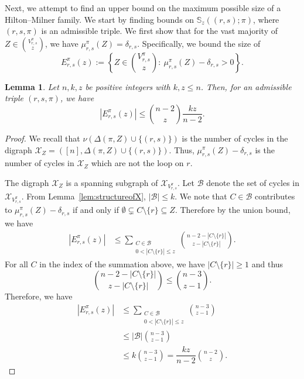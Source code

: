 \documentclass{amsart}
\newtheorem{lem}[thm]{Lemma}
\newcommand{\cy}{\nu}
\newcommand{\bb}{\mathbb}
\newcommand{\mcal}{\mathcal}
\begin{document}
Next, we attempt to find an upper bound on the maximum possible size of a Hilton--Milner family. We start by finding bounds on $\bb{S}_{z}((r,s);\pi)$, where $(r,s,\pi)$ is an admissible triple. We first show that for the vast majority of $Z \in \binom{V_{r,s}^{\pi}}{z}$, we have $\mu_{r,s}^{\pi}(Z)=\delta_{r,s}$. Specifically, we bound the size of
\begin{equation}\label{eq:exceptional}
E_{r,s}^{\pi}(z):=\left\{Z\in \binom{V_{r,s}^{\pi}}{z}\colon\ \mu_{r,s}^{\pi}(Z)-\delta_{r,s}>0\right\}.
\end{equation}

\begin{lem}\label{lem:overestimate}
Let $n,k,z$ be positive integers with $k,z\leq n$. Then, for an admissible triple $(r,s,\pi)$, we have
\[\left|E_{r,s}^{\pi}(z)\right|\leq \binom{n-2}{z} \dfrac{kz}{n-2}.\]
\end{lem}
\begin{proof}
We recall that $\cy(\Delta(\pi,Z) \cup \{(r,s)\})$ is the number of cycles in the digraph $\mcal{X}_{Z}=([n],\Delta(\pi,Z) \cup \{(r,s)\})$. Thus, $\mu_{r,s}^{\pi}(Z)-\delta_{r,s}$ is the number of cycles in $\mcal{X}_{Z}$ which are not the loop on $r$. 

The digraph $\mcal{X}_{Z}$ is a spanning subgraph of $\mcal{X}_{V_{r,s}^{\pi}}$. Let $\mcal{B}$ denote the set of cycles in $\mcal{X}_{V_{r,s}^{\pi}}$.
From Lemma~\ref{lem:structureofX}, $|\mcal{B}| \leq k$. We note that $C \in \mcal{B}$ contributes to $\mu_{r,s}^{\pi}(Z)-\delta_{r,s}$ if and only if $\emptyset \subsetneq C\setminus \{r\} \subseteq Z$. Therefore by the union bound, we have   
\begin{align*}
\left|E_{r,s}^{\pi}(z)\right| &\leq \sum\limits_{\substack{C \in \mcal{B}\\ 0<|C\setminus \{r\}| \leq z}} \binom{n-2-|C\setminus \{r\}|}{z-|C\setminus \{r\}|}.
\end{align*}
For all $C$ in the index of the summation above, we have $|C\setminus \{r\}|\geq 1$ and thus \[\binom{n-2-|C\setminus \{r\}|}{z-|C\setminus \{r\}|} \leq \binom{n-3}{z-1}.\] Therefore, we have
\begin{align*}
\left|E_{r,s}^{\pi}(z)\right| &\leq \sum\limits_{\substack{C \in \mcal{B}\\  0<|C\setminus \{r\}| \leq z}} \binom{n-3}{z-1} \\
& \leq |\mcal{B}|\binom{n-3}{z-1}\\ 
&\leq k \binom{n-3}{z-1} = \dfrac{kz}{n-2} \binom{n-2}{z}. 
\end{align*}
\end{proof}
\end{document}
